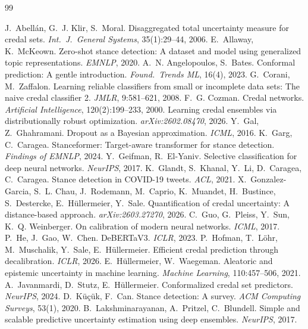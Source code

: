 \documentclass[11pt,a4paper]{article}
\begin{document}
\begin{thebibliography}{99}\small

 J.~Abell\'an, G.~J. Klir, S.~Moral. Disaggregated total uncertainty measure for credal sets. \emph{Int.\ J.\ General Systems}, 35(1):29--44, 2006.
 E.~Allaway, K.~McKeown. Zero-shot stance detection: A dataset and model using generalized topic representations. \emph{EMNLP}, 2020.
 A.~N. Angelopoulos, S.~Bates. Conformal prediction: A gentle introduction. \emph{Found.\ Trends ML}, 16(4), 2023.
 G.~Corani, M.~Zaffalon. Learning reliable classifiers from small or incomplete data sets: The naive credal classifier 2. \emph{JMLR}, 9:581--621, 2008.
 F.~G. Cozman. Credal networks. \emph{Artificial Intelligence}, 120(2):199--233, 2000.
 Learning credal ensembles via distributionally robust optimization. \emph{arXiv:2602.08470}, 2026.
 Y.~Gal, Z.~Ghahramani. Dropout as a Bayesian approximation. \emph{ICML}, 2016.
 K.~Garg, C.~Caragea. Stanceformer: Target-aware transformer for stance detection. \emph{Findings of EMNLP}, 2024.
 Y.~Geifman, R.~El-Yaniv. Selective classification for deep neural networks. \emph{NeurIPS}, 2017.
 K.~Glandt, S.~Khanal, Y.~Li, D.~Caragea, C.~Caragea. Stance detection in COVID-19 tweets. \emph{ACL}, 2021.
 X.~Gonzalez-Garcia, S.~L. Chau, J.~Rodemann, M.~Caprio, K.~Muandet, H.~Bustince, S.~Destercke, E.~H\"ullermeier, Y.~Sale. Quantification of credal uncertainty: A distance-based approach. \emph{arXiv:2603.27270}, 2026.
 C.~Guo, G.~Pleiss, Y.~Sun, K.~Q. Weinberger. On calibration of modern neural networks. \emph{ICML}, 2017.
 P.~He, J.~Gao, W.~Chen. DeBERTaV3. \emph{ICLR}, 2023.
 P.~Hofman, T.~L\"ohr, M.~Muschalik, Y.~Sale, E.~H\"ullermeier. Efficient credal prediction through decalibration. \emph{ICLR}, 2026.
 E.~H\"ullermeier, W.~Waegeman. Aleatoric and epistemic uncertainty in machine learning. \emph{Machine Learning}, 110:457--506, 2021.
 A.~Javanmardi, D.~Stutz, E.~H\"ullermeier. Conformalized credal set predictors. \emph{NeurIPS}, 2024.
 D.~K\"u\c{c}\"uk, F.~Can. Stance detection: A survey. \emph{ACM Computing Surveys}, 53(1), 2020.
 B.~Lakshminarayanan, A.~Pritzel, C.~Blundell. Simple and scalable predictive uncertainty estimation using deep ensembles. \emph{NeurIPS}, 2017.

\end{thebibliography}
\end{document}
